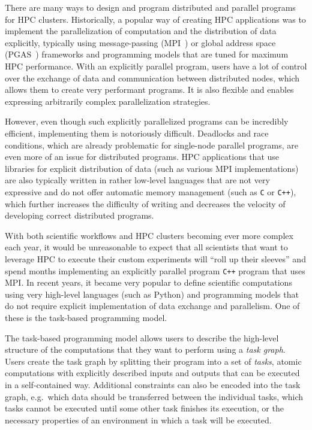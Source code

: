 There are many ways to design and program distributed and parallel programs for HPC clusters.
Historically, a popular way of creating HPC applications was to implement the parallelization of
computation and the distribution of data explicitly, typically using message-passing
(MPI~\cite{mpi}) or global address space (PGAS~\cite{pgas}) frameworks and
programming models that are tuned for maximum HPC performance. With an explicitly parallel program,
users have a lot of control over the exchange of data and communication between distributed nodes,
which allows them to create very performant programs. It is also flexible and enables expressing
arbitrarily complex parallelization strategies.

However, even though such explicitly parallelized programs can be incredibly efficient,
implementing them is notoriously difficult. Deadlocks and race conditions, which are already
problematic for single-node parallel programs, are even more of an issue for distributed programs.
HPC applications that use libraries for explicit distribution of data (such as various MPI
implementations) are also typically written in rather low-level languages that are not very
expressive and do not offer automatic memory management (such as \texttt{C} or
\texttt{C++}), which further increases the difficulty of writing and decreases the
velocity of developing correct distributed programs.

With both scientific workflows and HPC clusters becoming ever more complex each year, it would be
unreasonable to expect that all scientists that want to leverage HPC to execute their custom
experiments will ``roll up their sleeves'' and spend months implementing an explicitly parallel
program \texttt{C++} program that uses MPI. In recent years, it became very popular to
define scientific computations using very high-level languages (such as Python) and programming
models that do not require explicit implementation of data exchange and parallelism. One of these
is the task-based programming model.


The task-based programming model allows users to describe the high-level structure of the
computations that they want to perform using a \emph{task graph}. Users create the task graph
by splitting their program into a set of \emph{tasks}, atomic computations with
explicitly described inputs and outputs that can be executed in a self-contained way. Additional
constraints can also be encoded into the task graph, e.g.\ which data should be transferred between
the individual tasks, which tasks cannot be executed until some other task finishes its execution,
or the necessary properties of an environment in which a task will be executed.

